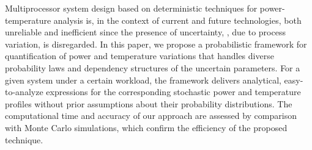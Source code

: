 Multiprocessor system design based on deterministic techniques for power-temperature analysis is, in the context of current and future technologies, both unreliable and inefficient since the presence of uncertainty, \eg, due to process variation, is disregarded. In this paper, we propose a probabilistic framework for quantification of power and temperature variations that handles diverse probability laws and dependency structures of the uncertain parameters. For a given system under a certain workload, the framework delivers analytical, easy-to-analyze expressions for the corresponding stochastic power and temperature profiles without prior assumptions about their probability distributions. The computational time and accuracy of our approach are assessed by comparison with Monte Carlo simulations, which confirm the efficiency of the proposed technique.
